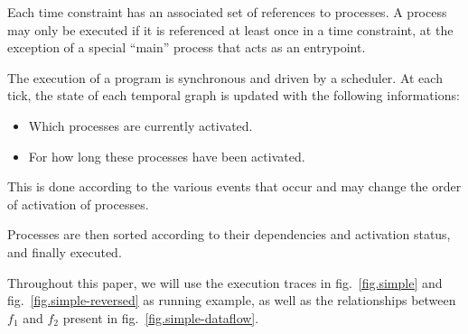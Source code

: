 \documentclass{article}
\begin{document}
Each time constraint has an associated set of references to processes.
A process may only be executed if it is referenced at least once in a time constraint, 
at the exception of a special ``main'' process that acts as an entrypoint.
    
The execution of a program is synchronous and driven by a scheduler.
At each tick, the state of each temporal graph is updated with the following informations:
    
\begin{itemize}
  \item Which processes are currently activated.
  \item For how long these processes have been activated.
\end{itemize}

This is done according to the various events that occur and may change the order of activation of processes.

Processes are then sorted according to their dependencies and activation status, and finally executed.
    

    
Throughout this paper, we will use the execution traces in fig.~\ref{fig.simple} and fig.~\ref{fig.simple-reversed} as running example, as well as the relationships between $f_1$ and $f_2$ present in fig.~\ref{fig.simple-dataflow}. 
    
\end{document}
